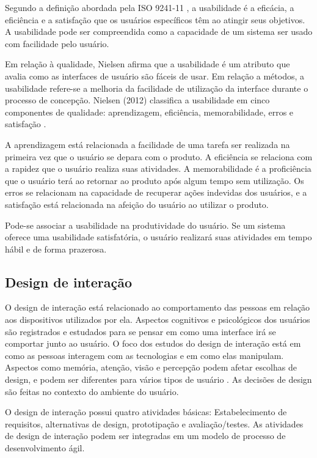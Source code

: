 Segundo a definição abordada pela ISO 9241-11 \cite{iso9241}, a usabilidade é a eficácia, a eficiência e a satisfação que os usuários específicos têm ao atingir seus objetivos. A usabilidade pode ser compreendida como a capacidade de um sistema ser usado com facilidade pelo usuário.

Em relação à qualidade, Nielsen \cite{usabilityintroduction} afirma que a usabilidade é um atributo que avalia como as interfaces de usuário são fáceis de usar. Em relação a métodos, a usabilidade refere-se a melhoria da facilidade de utilização da interface durante o processo de concepção. Nielsen (2012) classifica a usabilidade em cinco componentes de qualidade: aprendizagem, eficiência, memorabilidade, erros e satisfação . 

A aprendizagem está relacionada a facilidade de uma tarefa ser realizada na primeira vez que o usuário se depara com o produto. A eficiência se relaciona com a rapidez que o usuário realiza suas atividades. A memorabilidade é a proficiência que o usuário terá ao retornar ao produto após algum tempo sem utilização. Os erros se relacionam na capacidade de recuperar ações indevidas dos usuários, e a satisfação está relacionada na afeição do usuário ao utilizar o produto.

Pode-se associar a usabilidade na produtividade do usuário. Se um sistema oferece uma usabilidade satisfatória, o usuário realizará suas atividades em tempo hábil e de forma prazerosa.


\subsection{Design de interação}
O design de interação está relacionado ao comportamento das pessoas em relação aos dispositivos utilizados por ela. Aspectos cognitivos e psicológicos dos usuários são registrados e estudados para se pensar em como uma interface irá se comportar junto ao usuário. O foco dos estudos do design de interação está em como as pessoas interagem com as tecnologias e em como elas manipulam. Aspectos como memória, atenção, visão e percepção podem afetar escolhas de design, e podem ser diferentes para vários tipos de usuário \cite{Norman:2002:DET:2187809}. As decisões de design são feitas no contexto do ambiente do usuário. 

O design de interação possui quatro atividades básicas: Estabelecimento de requisitos, alternativas de design, prototipação e avaliação/testes. As atividades de design de interação podem ser integradas em um modelo de processo de desenvolvimento ágil.

